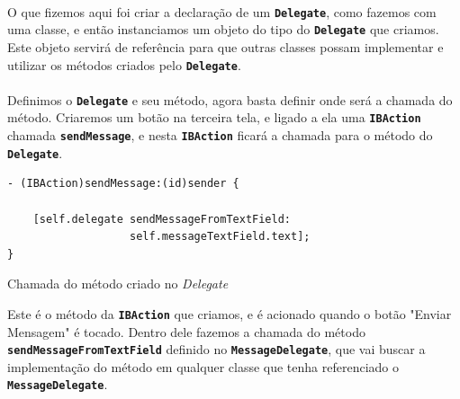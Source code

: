 \documentclass[a4paper,12pt,brazil,doubleside]{book}
\begin{document}
\begin{singlespace}
\paragraph{}O que fizemos aqui foi criar a declaração de um \texttt{\textbf{Delegate}}, como fazemos com uma classe, e então instanciamos um objeto do tipo do \texttt{\textbf{Delegate}} que criamos. Este objeto servirá de referência para que outras classes possam implementar e utilizar os métodos criados pelo \texttt{\textbf{Delegate}}.
\paragraph{}Definimos o \texttt{\textbf{Delegate}} e seu método, agora basta definir onde será a chamada do método. Criaremos um botão na terceira tela, e ligado a ela uma \texttt{\textbf{IBAction}} chamada \texttt{\textbf{sendMessage}}, e nesta \texttt{\textbf{IBAction}} ficará a chamada para o método do \texttt{\textbf{Delegate}}.

\begin{listing}
\begin{verbatim}
- (IBAction)sendMessage:(id)sender {
    
    [self.delegate sendMessageFromTextField:
                   self.messageTextField.text];
}
\end{verbatim}
\caption{Chamada do método criado no \emph{Delegate}}
\end{listing}

Este é o método da \texttt{\textbf{IBAction}} que criamos, e é acionado quando o botão "Enviar Mensagem" é tocado. Dentro dele fazemos a chamada do método \texttt{\textbf{sendMessageFromTextField}} definido no \texttt{\textbf{MessageDelegate}}, que vai buscar a implementação do método em qualquer classe que tenha referenciado o \texttt{\textbf{MessageDelegate}}.

\bigskip
\bigskip


\end{singlespace}
\end{document}
